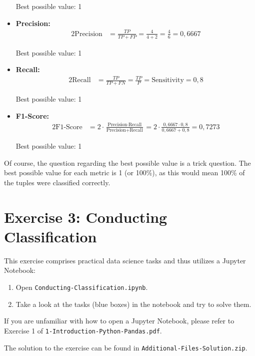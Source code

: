 \documentclass[
english,
smallborders
]{i6prcsht}
\begin{document}
\begin{solution}
\begin{itemize}
		      Best possible value: 1
		\item \textbf{Precision:}
		      \begin{alignat*}{2}
			      \text{Precision} & = \frac{TP}{TP + FP} = \frac{4}{4 + 2} = \frac{4}{6} = 0,6667
		      \end{alignat*}
		      
		      Best possible value: 1
		\item \textbf{Recall:}
		      \begin{alignat*}{2}
			      \text{Recall} & = \frac{TP}{TP + FN} = \frac{TP}{P} = \text{Sensitivity} = 0,8
		      \end{alignat*}
		      
		      Best possible value: 1
		\item \textbf{F1-Score:}
		      \begin{alignat*}{2}
			      \text{F1-Score} & = 2 \cdot \frac{\text{Precision} \cdot \text{Recall}}{\text{Precision} + \text{Recall}} = 2 \cdot \frac{0,6667 \cdot 0,8}{0,6667 + 0,8} = 0,7273
		      \end{alignat*}
		      
		      Best possible value: 1
	\end{itemize}
	
	Of course, the question regarding the best possible value is a trick question. The best possible value for each metric is 1 (or 100\%), as this would mean 100\% of the tuples were classified correctly.
	
	
\end{solution}

\newpage

\section*{Exercise 3: Conducting Classification}

This exercise comprises practical data science tasks and thus utilizes a Jupyter Notebook:

\begin{enumerate}
	\item Open \texttt{Conducting-Classification.ipynb}.
	\item Take a look at the tasks (blue boxes) in the notebook and try to solve them.
\end{enumerate}

If you are unfamiliar with how to open a Jupyter Notebook, please refer to Exercise 1 of \texttt{1-Introduction-Python-Pandas.pdf}.

\begin{solution}
	The solution to the exercise can be found in \texttt{Additional-Files-Solution.zip}.
\end{solution}
\end{document}
